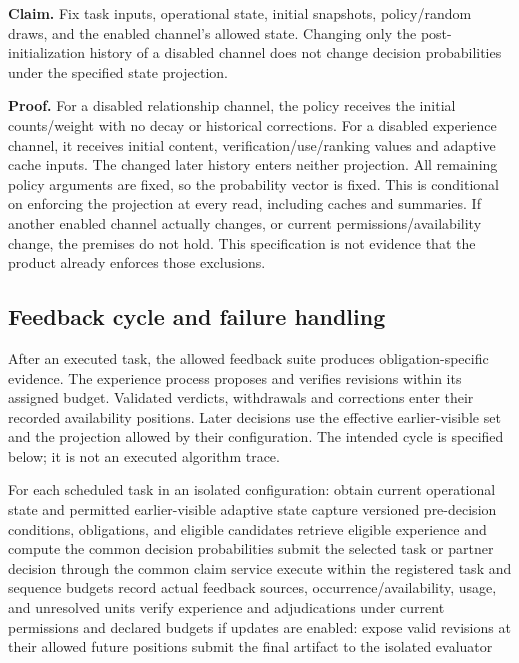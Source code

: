 \documentclass[
  english,
  11pt,
]{article}
\newenvironment{Shaded}{}{}
\newcommand{\NormalTok}[1]{#1}
\begin{document}
\textbf{Claim.} Fix task inputs, operational state, initial snapshots,
policy/random draws, and the enabled channel's allowed state. Changing
only the post-initialization history of a disabled channel does not
change decision probabilities under the specified state projection.

\textbf{Proof.} For a disabled relationship channel, the policy receives
the initial counts/weight with no decay or historical corrections. For a
disabled experience channel, it receives initial content,
verification/use/ranking values and adaptive cache inputs. The changed
later history enters neither projection. All remaining policy arguments
are fixed, so the probability vector is fixed. This is conditional on
enforcing the projection at every read, including caches and summaries.
If another enabled channel actually changes, or current
permissions/availability change, the premises do not hold. This
specification is not evidence that the product already enforces those
exclusions.

\subsection{Feedback cycle and failure
handling}\label{feedback-cycle-and-failure-handling}

After an executed task, the allowed feedback suite produces
obligation-specific evidence. The experience process proposes and
verifies revisions within its assigned budget. Validated verdicts,
withdrawals and corrections enter their recorded availability positions.
Later decisions use the effective earlier-visible set and the projection
allowed by their configuration. The intended cycle is specified below;
it is not an executed algorithm trace.

\begin{Shaded}
\begin{Highlighting}[]
\NormalTok{For each scheduled task in an isolated configuration:}
\NormalTok{    obtain current operational state and permitted earlier{-}visible adaptive state}
\NormalTok{    capture versioned pre{-}decision conditions, obligations, and eligible candidates}
\NormalTok{    retrieve eligible experience and compute the common decision probabilities}
\NormalTok{    submit the selected task or partner decision through the common claim service}
\NormalTok{    execute within the registered task and sequence budgets}
\NormalTok{    record actual feedback sources, occurrence/availability, usage, and unresolved units}
\NormalTok{    verify experience and adjudications under current permissions and declared budgets}
\NormalTok{    if updates are enabled: expose valid revisions at their allowed future positions}
\NormalTok{    submit the final artifact to the isolated evaluator}
\end{Highlighting}
\end{Shaded}
\end{document}
